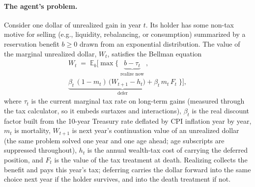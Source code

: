 \documentclass[10pt,twocolumn]{article}
\begin{document}
\paragraph{The agent's problem.}
Consider one dollar of unrealized gain in year $t$. Its holder has some
non-tax motive for selling (e.g., liquidity, rebalancing, or consumption)
summarized by a reservation benefit $b \geq 0$ drawn from an exponential
distribution.
The value of the marginal unrealized dollar, $W_t$, satisfies the Bellman
equation
\begin{multline*}
W_t \;=\; \mathbb{E}_b\Big[\max\Big\{\;\underbrace{b - \tau_t}_{\text{realize now}}\;,\\[2pt]
\underbrace{\beta_t\,(1-m_t)\,\big(W_{t+1} - h_t\big) + \beta_t\, m_t\, F_t}_{\text{defer}}\;\Big\}\Big],
\end{multline*}
where $\tau_t$ is the current marginal tax rate on long-term gains (measured
through the tax calculator, so it embeds surtaxes and interactions), $\beta_t$
is the real discount factor built from the 10-year Treasury rate deflated by
CPI inflation year by year, $m_t$ is mortality, $W_{t+1}$ is next year's
continuation value of an unrealized dollar (the same problem solved one year
and one age ahead; age subscripts are suppressed throughout), $h_t$ is the
annual wealth-tax cost of carrying the deferred position, and $F_t$ is the
value of the tax treatment at death. Realizing collects the benefit and pays
this year's tax; deferring carries the dollar forward into the same choice
next year if the holder survives, and into the death treatment if not.
\end{document}
